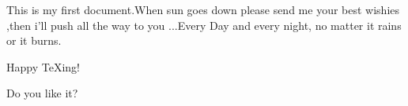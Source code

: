 \documentclass{article}
\begin{document}
	This is my first document.When sun goes down please send me your best wishies ,then i'll push all the way to you ...Every Day and every night, no matter it rains or it burns.
	
	Happy \TeX ing!
	
Do you like it?
\end{document}
